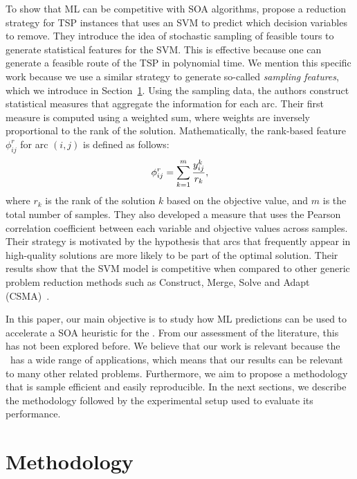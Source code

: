 \documentclass[3p, authoryear, times, doubleblind]{elsarticle}
\begin{document}
{To show that ML can be competitive with SOA algorithms, \cite{sun_generalization_2021} propose a reduction strategy for TSP instances that uses an SVM to predict which decision variables to remove. They introduce the idea of stochastic sampling of feasible tours to generate statistical features for the SVM. This is effective because one can generate a feasible route of the TSP in polynomial time. We mention this specific work because we use a similar strategy to generate so-called \emph{sampling features}, which we introduce in Section~\ref{sec:methodology}. Using the sampling data, the authors construct statistical measures that aggregate the information for each arc. Their first measure is computed using a weighted sum, where weights are inversely proportional to the rank of the solution.   Mathematically, the rank-based feature $ \phi^r _{ij}$ for arc $(i,j)$ is defined as follows: 
\begin{align}
    \phi^r _{ij} = \sum_{k=1}^{m} \frac{y_{ij}^k}{r_k}, 
\end{align} 
where $r_k$ is the rank of the solution $k$ based on the objective value, and $m$ is the total number of samples. They also developed a measure that uses the Pearson correlation coefficient between each variable and objective values across samples. Their strategy is motivated by the hypothesis that arcs that frequently appear in high-quality solutions are more likely to be part of the optimal solution. Their results show that the SVM model is competitive when compared to other generic problem reduction methods such as Construct, Merge, Solve and Adapt (CSMA)~\citep{blum_construct_2016}. 

In this paper, our main objective is to study how ML predictions can be used to accelerate a SOA heuristic for the \fcn. From our assessment of the literature, this has not been explored before. We believe that our work is relevant because the \fcn~has a wide range of applications, which means that our results can be relevant to many other related problems.  Furthermore, we aim to propose a methodology that is sample efficient and easily reproducible. In the next sections, we describe the methodology followed by the experimental setup used to evaluate its performance.

\section{Methodology} \label{sec:methodology}

}
\end{document}
